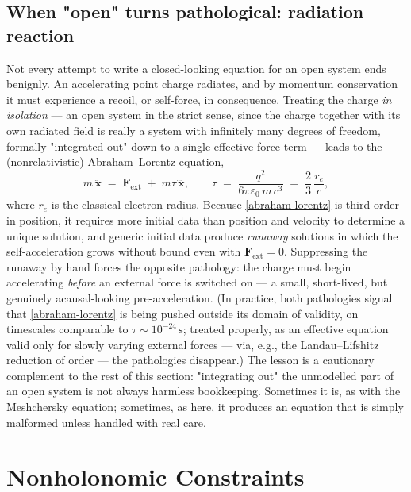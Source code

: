 \section{When "open" turns pathological: radiation reaction}

Not every attempt to write a closed-looking equation for an open
system ends benignly. An accelerating point charge radiates, and by
momentum conservation it must experience a recoil, or self-force, in
consequence. Treating the charge \emph{in isolation} --- an open
system in the strict sense, since the charge together with its own
radiated field is really a system with infinitely many degrees of
freedom, formally "integrated out" down to a single effective force
term --- leads to the (nonrelativistic) Abraham--Lorentz equation,
\begin{equation}
  m\,\ddot{\mathbf x} \;=\; \mathbf F_{\mathrm{ext}} \;+\;
  m\tau\,\dddot{\mathbf x} ,
  \qquad
  \tau \;=\; \frac{q^2}{6\pi\varepsilon_0\,m\,c^3}
  \;=\; \frac{2}{3}\,\frac{r_e}{c},
  \label{abraham-lorentz}
\end{equation}
where $r_e$ is the classical electron radius. Because
\eqref{abraham-lorentz} is third order in position, it requires
more initial data than position and velocity to determine a unique
solution, and generic initial data produce \emph{runaway} solutions
in which the self-acceleration grows without bound even with
$\mathbf F_{\mathrm{ext}}=0$. Suppressing the runaway by hand forces
the opposite pathology: the charge must begin accelerating
\emph{before} an external force is switched on --- a small, short-lived,
but genuinely acausal-looking pre-acceleration. (In practice, both
pathologies signal that \eqref{abraham-lorentz} is being pushed
outside its domain of validity, on timescales comparable to $\tau
\sim 10^{-24}\,\mathrm s$; treated properly, as an effective equation
valid only for slowly varying external forces --- via, e.g., the
Landau--Lifshitz reduction of order --- the pathologies disappear.)
The lesson is a cautionary complement to the rest of this section:
"integrating out" the unmodelled part of an open system is not
always harmless bookkeeping. Sometimes it is, as with the Meshchersky
equation; sometimes, as here, it produces an equation that is simply
malformed unless handled with real care.

\chapter{Nonholonomic Constraints}
\label{nh}

